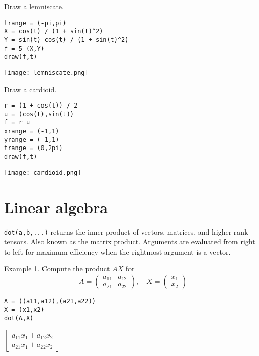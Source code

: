 \documentclass[12pt]{article}
\begin{document}
Draw a lemniscate.

{\color{blue}
\begin{verbatim}
trange = (-pi,pi)
X = cos(t) / (1 + sin(t)^2)
Y = sin(t) cos(t) / (1 + sin(t)^2)
f = 5 (X,Y)
draw(f,t)
\end{verbatim}}

\begin{center}
\texttt{[image: lemniscate.png]}
\end{center}

Draw a cardioid.

{\color{blue}
\begin{verbatim}
r = (1 + cos(t)) / 2
u = (cos(t),sin(t))
f = r u
xrange = (-1,1)
yrange = (-1,1)
trange = (0,2pi)
draw(f,t)
\end{verbatim}}

\begin{center}
\texttt{[image: cardioid.png]}
\end{center}

\newpage

\section{Linear algebra}

\verb$dot(a,b,...)$ returns the inner product of vectors, matrices,
and higher rank tensors.
Also known as the matrix product.
Arguments are evaluated from right to left
for maximum efficiency when the rightmost argument is a vector.

\bigskip

Example 1. Compute the product $AX$ for
\begin{equation*}
A=\begin{pmatrix}a_{11}&a_{12}\\a_{21}&a_{22}\end{pmatrix},
\quad
X=\begin{pmatrix}x_1\\x_2\end{pmatrix}
\end{equation*}

{\color{blue}
\begin{verbatim}
A = ((a11,a12),(a21,a22))
X = (x1,x2)
dot(A,X)
\end{verbatim}
}

$\displaystyle
\begin{bmatrix}
a_{11}x_1+a_{12}x_2
\\[1ex]
a_{21}x_1+a_{22}x_2
\end{bmatrix}
$
\end{document}
